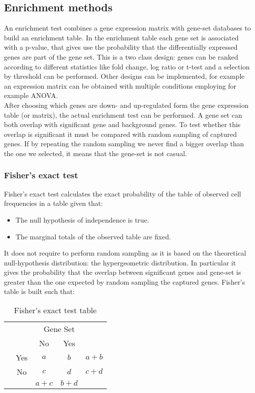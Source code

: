 	\subsection{Enrichment methods}
	An enrichment test combines a gene expression matrix with gene-set databases to build an enrichment table.
	In the enrichment table each gene set is associated with a p-value, that gives use the probability that the differentially expressed genes are part of the gene set.
	This is a two class design: genes can be ranked according to different statistics like fold change, log ratio or t-test and a selection by threshold can be performed.
	Other designs can be implemented, for example an expression matrix can be obtained with multiple conditions employing for example ANOVA.
	\\
	After choosing which genes are down- and up-regulated form the gene expression table (or matrix), the actual enrichment test can be performed. 
	A gene set can both overlap with significant gene and background genes.
	To test whether this overlap is significant it must be compared with random sampling of captured genes.
	If by repeating the random sampling we never find a bigger overlap than the one we selected, it means that the gene-set is not casual.

		\subsubsection{Fisher's exact test}
		Fisher's exact test calculates the exact probability of the table of observed cell frequencies in a table given that:

			\begin{itemize}
				\item The null hypothesis of independence is true.
				\item The marginal totals of the observed table are fixed.
			\end{itemize}

		It does not require to perform random sampling as it is based on the theoretical null-hypothesis distribution: the hypergeometric distribution.
		In particular it gives the probability that the overlap between significant genes and gene-set is greater than the one expected by random sampling the captured genes.
		Fisher's table is built such that:

		\begin{table}[H]
			\centering
			\begin{tabular}{ccccc}
				\multirow{4}{*}{\rotatebox[origin=c]{90}{\tiny{Up regulated genes}}}& \multicolumn{4}{c}{Gene Set}\\
				 & & No & Yes & \\
				 \cline{3-4}
				 &Yes & \multicolumn{1}{|c|}{$a$} & \multicolumn{1}{|c|}{$b$} & $a+b$\\
				 \cline{3-4}
				 &No & \multicolumn{1}{|c|}{$c$} & \multicolumn{1}{|c|}{$d$} & $c+d$\\
				 \cline{3-4}
				 & & $a+c$ & $b+d$ & \\
			\end{tabular}
			\caption{Fisher's exact test table}
			\label{tab:fisher}
		\end{table}

